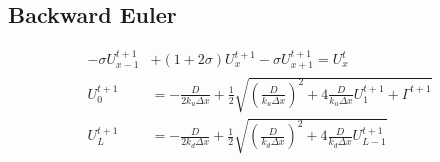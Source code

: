 \documentclass[../summary.tex]{subfiles}
\begin{document}
\subsection{Backward Euler}

\begin{align}
    -\sigma U_{x-1}^{t+1} &+ (1+2\sigma)U_{x}^{t+1} - \sigma U_{x+1}^{t+1} = U_{x}^{t}\\
    U_{0}^{t+1} &= -\frac{D}{2k_u\Delta x} + \frac{1}{2}\sqrt{\left(\frac{D}{k_u\Delta x}\right)^2 + 4\frac{D}{k_u\Delta x}U_{1}^{t+1} + \Gamma^{t+1}}\\
    U_{L}^{t+1} &= -\frac{D}{2k_d\Delta x} + \frac{1}{2}\sqrt{\left(\frac{D}{k_d\Delta x}\right)^2 + 4\frac{D}{k_d\Delta x}U_{L-1}^{t+1}}
\end{align}
\end{document}
